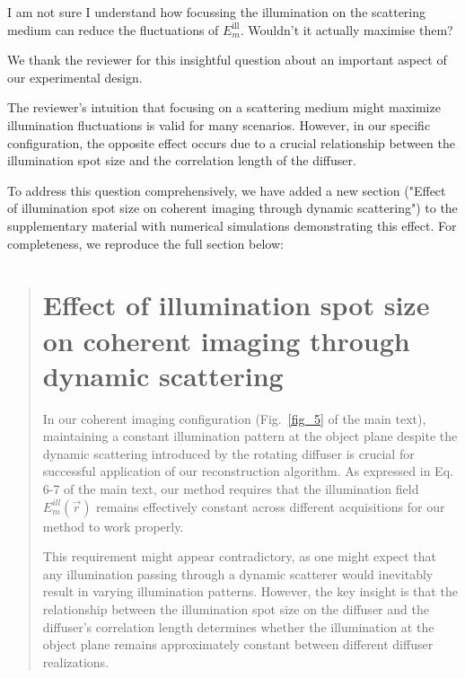 \documentclass[12pt]{article}
\newenvironment{solved_reviewercomment}
    {\begin{tcolorbox}[width=\linewidth,colback=gray!5,colframe=solved_commentcolor!50,title=Reviewer Comment,left=5pt,right=5pt]}
    {\end{tcolorbox}}
\newenvironment{ourresponse}
    {\begin{tcolorbox}[width=\linewidth,breakable,enhanced,colback=gray!5,colframe=responsecolor!50,title=Response,left=5pt,right=5pt]}
    {\end{tcolorbox}}
\begin{document}
    \leavevmode\vspace{-\baselineskip}
        \begin{solved_reviewercomment}
            I am not sure I understand how focussing the illumination on the scattering medium can reduce the fluctuations of \(E^{\text{ill}}_m\). Wouldn't it actually maximise them?    
        \end{solved_reviewercomment}
        \begin{ourresponse}
        We thank the reviewer for this insightful question about an important aspect of our experimental design.
        
        The reviewer's intuition that focusing on a scattering medium might maximize illumination fluctuations is valid for many scenarios. However, in our specific configuration, the opposite effect occurs due to a crucial relationship between the illumination spot size and the correlation length of the diffuser.
        
        To address this question comprehensively, we have added a new section ("Effect of illumination spot size on coherent imaging through dynamic scattering") to the supplementary material with numerical simulations demonstrating this effect. For completeness, we reproduce the full section below:
        \begin{quote}
            \section*{Effect of illumination spot size on coherent imaging through dynamic scattering}
        
        In our coherent imaging configuration (Fig.~\ref{fig_5} of the main text), maintaining a constant illumination pattern at the object plane despite the dynamic scattering introduced by the rotating diffuser is crucial for successful application of our reconstruction algorithm. As expressed in Eq. 6-7 of the main text, our method requires that the illumination field $E_m^{ill}(\vec{r})$ remains effectively constant across different acquisitions for our method to work properly.
        
        This requirement might appear contradictory, as one might expect that any illumination passing through a dynamic scatterer would inevitably result in varying illumination patterns. However, the key insight is that the relationship between the illumination spot size on the diffuser and the diffuser's correlation length determines whether the illumination at the object plane remains approximately constant between different diffuser realizations.
        

\end{quote}
\end{ourresponse}
\end{document}
